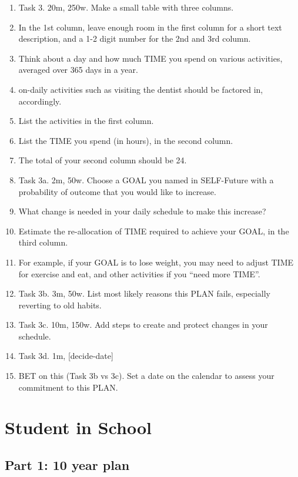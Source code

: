 \documentclass[
]{book}
\providecommand{\tightlist}{%
  \setlength{\itemsep}{0pt}\setlength{\parskip}{0pt}}
\begin{document}
\begin{enumerate}
\def\labelenumi{\arabic{enumi}.}
\setcounter{enumi}{77}
\tightlist
\item
  Task 3. 20m, 250w. Make a small table with three columns.
\item
  In the 1st column, leave enough room in the first column for a short text
  description, and a 1-2 digit number for the 2nd and 3rd column.
\item
  Think about a day and how much TIME you spend on various activities, averaged
  over 365 days in a year.
\item
  on-daily activities such as visiting the dentist should be factored in, accordingly.
\item
  List the activities in the first column.
\item
  List the TIME you spend (in hours), in the second column.
\item
  The total of your second column should be 24.
\item
  Task 3a. 2m, 50w. Choose a GOAL you named in SELF-Future with a probability
  of outcome that you would like to increase.
\item
  What change is needed in your daily schedule to make this increase?
\item
  Estimate the re-allocation of TIME required to achieve your GOAL, in the third
  column.
\item
  For example, if your GOAL is to lose weight, you may need to adjust TIME for
  exercise and eat, and other activities if you ``need more TIME''.
\item
  Task 3b. 3m, 50w. List most likely reasons this PLAN fails, especially reverting to
  old habits.
\item
  Task 3c. 10m, 150w. Add steps to create and protect changes in your schedule.
\item
  Task 3d. 1m, {[}decide-date{]}
\item
  BET on this (Task 3b vs 3c). Set a date on the calendar to assess your
  commitment to this PLAN.
\end{enumerate}

\hypertarget{student-in-school}{%
\chapter{Student in School}\label{student-in-school}}

\hypertarget{part-1-10-year-plan}{%
\section{Part 1: 10 year plan}\label{part-1-10-year-plan}}
\end{document}
